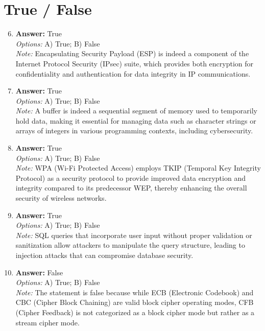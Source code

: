 \documentclass[12pt]{article}
\begin{document}
\section*{True / False}
\begin{enumerate}[label=\arabic*.]
\setcounter{enumi}{5}
\item \textbf{Answer:} True
\\ \textit{Options:} A) True; B) False
\\ \textit{Note:} Encapsulating Security Payload (ESP) is indeed a component of the Internet Protocol Security (IPsec) suite, which provides both encryption for confidentiality and authentication for data integrity in IP communications.
\item \textbf{Answer:} True
\\ \textit{Options:} A) True; B) False
\\ \textit{Note:} A buffer is indeed a sequential segment of memory used to temporarily hold data, making it essential for managing data such as character strings or arrays of integers in various programming contexts, including cybersecurity.
\item \textbf{Answer:} True
\\ \textit{Options:} A) True; B) False
\\ \textit{Note:} WPA (Wi-Fi Protected Access) employs TKIP (Temporal Key Integrity Protocol) as a security protocol to provide improved data encryption and integrity compared to its predecessor WEP, thereby enhancing the overall security of wireless networks.
\item \textbf{Answer:} True
\\ \textit{Options:} A) True; B) False
\\ \textit{Note:} SQL queries that incorporate user input without proper validation or sanitization allow attackers to manipulate the query structure, leading to injection attacks that can compromise database security.
\item \textbf{Answer:} False
\\ \textit{Options:} A) True; B) False
\\ \textit{Note:} The statement is false because while ECB (Electronic Codebook) and CBC (Cipher Block Chaining) are valid block cipher operating modes, CFB (Cipher Feedback) is not categorized as a block cipher mode but rather as a stream cipher mode.
\end{enumerate}
\end{document}
